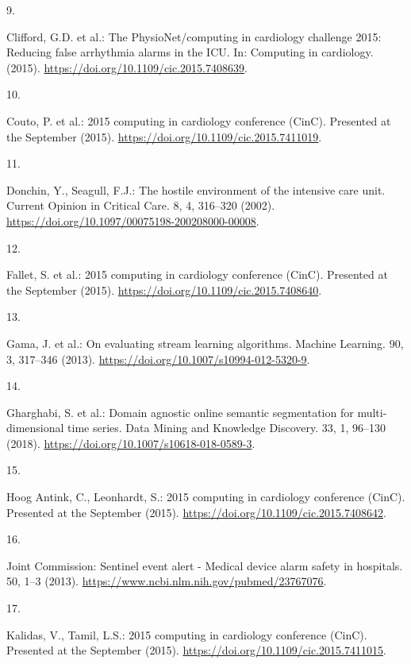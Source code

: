 \documentclass[runningheads]{llncs}
\newlength{\cslhangindent}
\newlength{\csllabelwidth}
\newenvironment{CSLReferences}[2] %
 {%
  \setlength{\parindent}{0pt}
  \ifodd #1 \everypar{\setlength{\hangindent}{\cslhangindent}}\ignorespaces\fi
  \ifnum #2 > 0
  \setlength{\parskip}{#2\baselineskip}
  \fi
 }%
 {}
\newcommand{\CSLLeftMargin}[1]{\parbox[t]{\csllabelwidth}{#1}}
\newcommand{\CSLRightInline}[1]{\parbox[t]{\linewidth - \csllabelwidth}{#1}\break}
\begin{document}
\begin{CSLReferences}{0}{0}
\leavevmode{}%
\CSLLeftMargin{9. }
\CSLRightInline{Clifford, G.D. et al.: The PhysioNet/computing in
cardiology challenge 2015: Reducing false arrhythmia alarms in the ICU.
In: Computing in cardiology. (2015).
\url{https://doi.org/10.1109/cic.2015.7408639}.}

\leavevmode{}%
\CSLLeftMargin{10. }
\CSLRightInline{Couto, P. et al.: 2015 computing in cardiology
conference (CinC). Presented at the September (2015).
\url{https://doi.org/10.1109/cic.2015.7411019}.}

\leavevmode{}%
\CSLLeftMargin{11. }
\CSLRightInline{Donchin, Y., Seagull, F.J.: The hostile environment of
the intensive care unit. Current Opinion in Critical Care. 8, 4,
316--320 (2002).
\url{https://doi.org/10.1097/00075198-200208000-00008}.}

\leavevmode{}%
\CSLLeftMargin{12. }
\CSLRightInline{Fallet, S. et al.: 2015 computing in cardiology
conference (CinC). Presented at the September (2015).
\url{https://doi.org/10.1109/cic.2015.7408640}.}

\leavevmode{}%
\CSLLeftMargin{13. }
\CSLRightInline{Gama, J. et al.: {On evaluating stream learning
algorithms}. Machine Learning. 90, 3, 317--346 (2013).
\url{https://doi.org/10.1007/s10994-012-5320-9}.}

\leavevmode{}%
\CSLLeftMargin{14. }
\CSLRightInline{Gharghabi, S. et al.: Domain agnostic online semantic
segmentation for multi-dimensional time series. Data Mining and
Knowledge Discovery. 33, 1, 96--130 (2018).
\url{https://doi.org/10.1007/s10618-018-0589-3}.}

\leavevmode{}%
\CSLLeftMargin{15. }
\CSLRightInline{Hoog Antink, C., Leonhardt, S.: 2015 computing in
cardiology conference (CinC). Presented at the September (2015).
\url{https://doi.org/10.1109/cic.2015.7408642}.}

\leavevmode{}%
\CSLLeftMargin{16. }
\CSLRightInline{Joint Commission: {Sentinel event alert - Medical device
alarm safety in hospitals.} 50, 1--3 (2013).
\url{https://www.ncbi.nlm.nih.gov/pubmed/23767076}.}

\leavevmode{}%
\CSLLeftMargin{17. }
\CSLRightInline{Kalidas, V., Tamil, L.S.: 2015 computing in cardiology
conference (CinC). Presented at the September (2015).
\url{https://doi.org/10.1109/cic.2015.7411015}.}


\end{CSLReferences}
\end{document}
